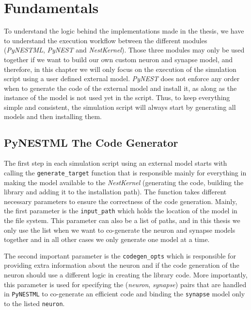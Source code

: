 \chapter{Fundamentals}
 \label{chap:funds}
 
 To understand the logic behind the implementations made in the thesis, we have to understand the execution workflow between the different modules (\emph{PyNESTML}, \emph{PyNEST} and \emph{NestKernel}). Those three modules may only be used together if we want to build our own custom neuron and synapse model, and therefore, in this chapter we will only focus on the execution of the simulation script using a user defined external model. \emph{PyNEST} does not enforce any order when to generate the code of the external model and install it, as along as the instance of the model is not used yet in the script. Thus, to keep everything simple and consistent, the simulation script will always start by generating all models and then installing them.
 
 
 
 
 
\section{PyNESTML The Code Generator}
 
 
The first step in each simulation script using an external model starts with calling the \texttt{generate\_target} function that is responsible mainly for everything in making the model available to the \emph{NestKernel} (generating the code, building the library and adding it to the installation path). The function takes different necessary parameters to ensure the correctness of the code generation. Mainly, the first parameter is the \texttt{input\_path} which holds the location of the model in the file system. This parameter can also be a list of paths, and in this thesis we only use the list when we want to co-generate the neuron and synapse models together and in all other cases we only generate one model at a time.
 


The second important parameter is the \texttt{codegen\_opts} which is responsible for providing extra information about the neuron  and if the code generation of the neuron should use a different logic in creating the library code. More importantly, this parameter is used for specifying the (\emph{neuron}, \emph{synapse}) pairs that are handled in \texttt{PyNESTML} to co-generate an efficient code and binding the \texttt{synapse} model only to the listed \texttt{neuron}. 

